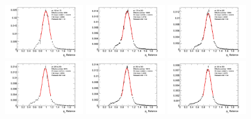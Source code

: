 \begin{figure}[htb!]
    \centering
    \includegraphics[width=0.31\textwidth]{plots/insitu/fits_sherpa_zee_nominal/Zeejet_Nominal_Bin2.png}
    \includegraphics[width=0.31\textwidth]{plots/insitu/fits_sherpa_zee_nominal/Zeejet_Nominal_Bin3.png}
    \includegraphics[width=0.31\textwidth]{plots/insitu/fits_sherpa_zee_nominal/Zeejet_Nominal_Bin4.png}
    \includegraphics[width=0.31\textwidth]{plots/insitu/fits_sherpa_zee_nominal/Zeejet_Nominal_Bin5.png}
    \includegraphics[width=0.31\textwidth]{plots/insitu/fits_sherpa_zee_nominal/Zeejet_Nominal_Bin6.png}
    \includegraphics[width=0.31\textwidth]{plots/insitu/fits_sherpa_zee_nominal/Zeejet_Nominal_Bin7.png}

\end{figure}
